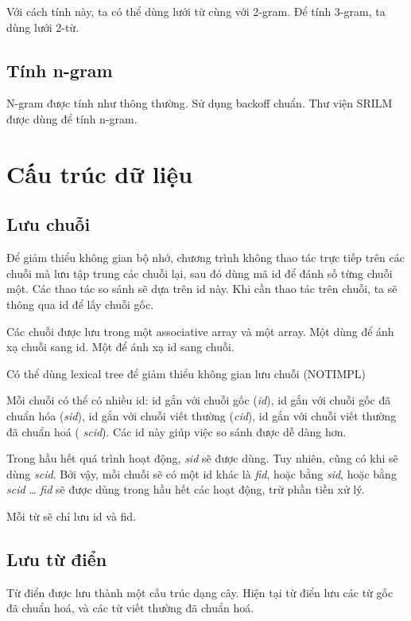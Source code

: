 \documentclass[a4paper]{book} %
\begin{document}
Với cách tính này, ta có thể dùng lưới từ cùng với 2-gram. Để tính
3-gram, ta dùng lưới 2-từ. 

\subsection{Tính n-gram}

N-gram được tính như thông thường. Sử dụng backoff chuẩn. Thư viện
SRILM được dùng để tính n-gram.



\section{Cấu trúc dữ liệu}


\subsection{Lưu chuỗi}

Để giảm thiểu không gian bộ nhớ, chương trình không thao tác trực tiếp
trên các chuỗi mà lưu tập trung các chuỗi lại, sau đó dùng mã id để
đánh số từng chuỗi một. Các thao tác so sánh sẽ dựa trên id này. Khi
cần thao tác trên chuỗi, ta sẽ thông qua id để lấy chuỗi gốc.

Các chuỗi được lưu trong một associative array và một array. Một dùng
để ánh xạ chuỗi sang id. Một để ánh xạ id sang chuỗi.

Có thể dùng lexical tree để giảm thiểu không gian lưu chuỗi (NOTIMPL)

Mỗi chuỗi có thể có nhiều id: id gắn với chuỗi gốc ({\em id}), id gắn
với chuỗi gốc đã chuẩn hóa ({\em sid}), id gắn với chuỗi viết thường
({\em cid}), id  gắn với chuỗi viết thường đã chuẩn hoá ({\em
  scid}). Các id này giúp việc so sánh được dễ dàng hơn. 

Trong hầu hết quá trình hoạt động, {\em sid} sẽ được dùng. Tuy nhiên,
cũng có khi sẽ dùng {\em scid}. Bởi vậy, mỗi chuỗi sẽ có một id khác
là {\em fid}, hoặc bằng {\em sid}, hoặc bằng {\em scid} \ldots{} {\em
  fid} sẽ được dùng trong hầu hết các hoạt động, trừ phần tiền xử lý.

Mỗi từ sẽ chỉ lưu id và fid.

\subsection{Lưu từ điển}

Từ điển được lưu thành một cấu trúc dạng cây. Hiện tại từ điển lưu các
từ gốc đã chuẩn hoá, và các từ viết thường đã chuẩn hoá.
\end{document}

